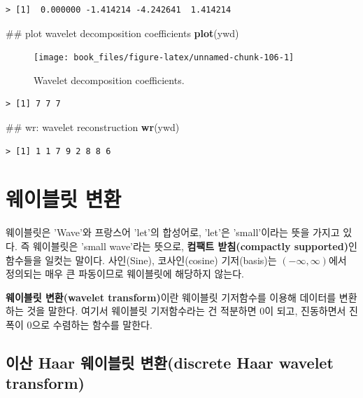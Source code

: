 \documentclass[b5paper,]{book}
\makeatletter
\newenvironment{Shaded}{\begin{snugshade}}{\end{snugshade}}
\newcommand{\KeywordTok}[1]{\textcolor[rgb]{0.13,0.29,0.53}{\textbf{{#1}}}}
\newcommand{\NormalTok}[1]{{#1}}
\newenvironment{kframe}{%
\medskip{}
\setlength{\fboxsep}{.8em}
 \def\at@end@of@kframe{}%
 \ifinner\ifhmode%
  \def\at@end@of@kframe{\end{minipage}}%
  \begin{minipage}{\columnwidth}%
 \fi\fi%
 \def\FrameCommand##1{\hskip\@totalleftmargin \hskip-\fboxsep
 \colorbox{shadecolor}{##1}\hskip-\fboxsep
     \hskip-\linewidth \hskip-\@totalleftmargin \hskip\columnwidth}%
 \MakeFramed {\advance\hsize-\width
   \@totalleftmargin\z@ \linewidth\hsize
   \@setminipage}}%
 {\par\unskip\endMakeFramed%
 \at@end@of@kframe}
\renewenvironment{Shaded}{\begin{kframe}}{\end{kframe}}
\theoremstyle{definition}
\theoremstyle{definition}
\theoremstyle{definition}
\theoremstyle{remark}
\makeatother
\begin{document}
\begin{verbatim}
> [1]  0.000000 -1.414214 -4.242641  1.414214
\end{verbatim}

\begin{Shaded}
\begin{Highlighting}[]
\NormalTok{## plot wavelet decomposition coefficients}
\KeywordTok{plot}\NormalTok{(ywd)}
\end{Highlighting}
\end{Shaded}

\begin{figure}

{\centering \texttt{[image: book\_files/figure-latex/unnamed-chunk-106-1]} 

}

\caption{Wavelet decomposition coefficients.}\label{fig:unnamed-chunk-106}
\end{figure}

\begin{verbatim}
> [1] 7 7 7
\end{verbatim}

\begin{Shaded}
\begin{Highlighting}[]
\NormalTok{## wr: wavelet reconstruction}
\KeywordTok{wr}\NormalTok{(ywd)}
\end{Highlighting}
\end{Shaded}

\begin{verbatim}
> [1] 1 1 7 9 2 8 8 6
\end{verbatim}

\chapter{웨이블릿 변환}\label{wavelettransform}

웨이블릿은 'Wave'와 프랑스어 'let'의 합성어로, 'let'은 'small'이라는
뜻을 가지고 있다. 즉 웨이블릿은 'small wave'라는 뜻으로, \textbf{컴팩트
받침(compactly supported)}인 함수들을 일컷는 말이다. 사인(Sine),
코사인(cosine) 기저(basis)는 \((-\infty, \infty)\)에서 정의되는 매우 큰
파동이므로 웨이블릿에 해당하지 않는다.

\textbf{웨이블릿 변환(wavelet transform)}이란 웨이블릿 기저함수를 이용해
데이터를 변환하는 것을 말한다. 여기서 웨이블릿 기저함수라는 건 적분하면
0이 되고, 진동하면서 진폭이 0으로 수렴하는 함수를 말한다.

\section{이산 Haar 웨이블릿 변환(discrete Haar wavelet
transform)}\label{-haar--discrete-haar-wavelet-transform}
\end{document}
